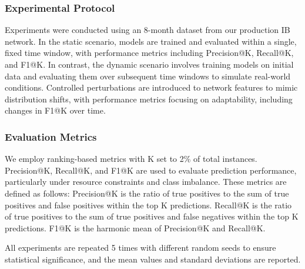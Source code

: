 \documentclass[conference]{IEEEtran}
\begin{document}
\subsubsection{Experimental Protocol}
Experiments were conducted using an 8-month dataset from our production IB network. In the static scenario, models are trained and evaluated within a single, fixed time window, with performance metrics including Precision@K, Recall@K, and F1@K. In contrast, the dynamic scenario involves training models on initial data and evaluating them over subsequent time windows to simulate real-world conditions. Controlled perturbations are introduced to network features to mimic distribution shifts, with performance metrics focusing on adaptability, including changes in F1@K over time.

\subsubsection{Evaluation Metrics}
We employ ranking-based metrics with K set to 2\% of total instances. Precision@K, Recall@K, and F1@K are used to evaluate prediction performance, particularly under resource constraints and class imbalance. These metrics are defined as follows: Precision@K is the ratio of true positives to the sum of true positives and false positives within the top K predictions. Recall@K is the ratio of true positives to the sum of true positives and false negatives within the top K predictions. F1@K is the harmonic mean of Precision@K and Recall@K.

All experiments are repeated 5 times with different random seeds to ensure statistical significance, and the mean values and standard deviations are reported.
\end{document}
